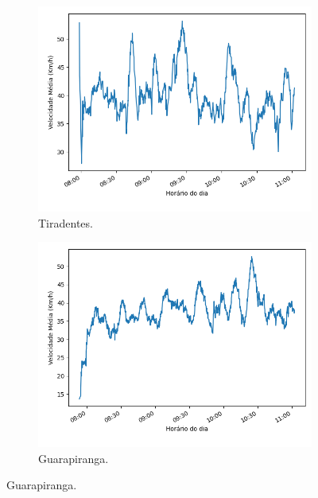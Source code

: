 \begin{figure}
\centering
\begin{subfigure}{.5\textwidth}
  \centering
\includegraphics[width=\textwidth]{figuras/detect_graphics/avg_speed_7-dez-su-corr_Tiradentes.png}
\caption{Tiradentes.}
\label{fig::avg_speed_Tiradentes}
\end{subfigure}%
\begin{subfigure}{.5\textwidth}
 \centering
 \includegraphics[width=\textwidth]{figuras/detect_graphics/avg_speed_7-dez-su-corr_Guarapiranga.png}
 \caption{Guarapiranga.}
 \label{fig::avg_speed_Guarapiranga}
\end{subfigure}

\end{figure}
